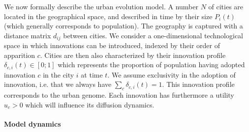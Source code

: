 \documentclass[letterpaper]{article}
\begin{document}
 
We now formally describe the urban evolution model. A number $N$ of cities are located in the geographical space, and described in time by their size $P_i (t)$ (which generally corresponds to population). The geography is captured with a distance matrix $d_{ij}$ between cities. We consider a one-dimensional technological space in which innovations can be introduced, indexed by their order of apparition $c$. Cities are then also characterized by their innovation profile $\delta_{c,i} (t) \in \left[0;1\right]$ which represents the proportion of population having adopted innovation $c$ in the city $i$ at time $t$. We assume exclusivity in the adoption of innovation, i.e. that we always have $\sum_c \delta_{c,i} (t) = 1$. This innovation profile corresponds to the urban genome. Each innovation has furthermore a utility $u_c >0$ which will influence its diffusion dynamics.


\paragraph{Model dynamics}

\end{document}
